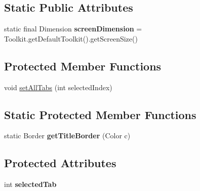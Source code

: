 \subsection*{Static Public Attributes}
\begin{DoxyCompactItemize}
\item 
\hypertarget{classgov_1_1fnal_1_1ppd_1_1dd_1_1ChangeChannelOnFrame_a305a0d34f0d58de670e2e105bd05635f}{static final Dimension {\bfseries screen\-Dimension} = Toolkit.\-get\-Default\-Toolkit().get\-Screen\-Size()}\label{classgov_1_1fnal_1_1ppd_1_1dd_1_1ChangeChannelOnFrame_a305a0d34f0d58de670e2e105bd05635f}

\end{DoxyCompactItemize}
\subsection*{Protected Member Functions}
\begin{DoxyCompactItemize}
\item 
void \hyperlink{classgov_1_1fnal_1_1ppd_1_1dd_1_1ChangeChannelOnFrame_aab9e479cfeecc447c6a061d7fbe2e054}{set\-All\-Tabs} (int selected\-Index)
\end{DoxyCompactItemize}
\subsection*{Static Protected Member Functions}
\begin{DoxyCompactItemize}
\item 
\hypertarget{classgov_1_1fnal_1_1ppd_1_1dd_1_1ChangeChannelOnFrame_ad3ecdc557c04618b3aecc20940e3080e}{static Border {\bfseries get\-Title\-Border} (Color c)}\label{classgov_1_1fnal_1_1ppd_1_1dd_1_1ChangeChannelOnFrame_ad3ecdc557c04618b3aecc20940e3080e}

\end{DoxyCompactItemize}
\subsection*{Protected Attributes}
\begin{DoxyCompactItemize}
\item 
\hypertarget{classgov_1_1fnal_1_1ppd_1_1dd_1_1ChangeChannelOnFrame_af667d17f45ce6f2a610c10746cd6b304}{int {\bfseries selected\-Tab}}\label{classgov_1_1fnal_1_1ppd_1_1dd_1_1ChangeChannelOnFrame_af667d17f45ce6f2a610c10746cd6b304}

\end{DoxyCompactItemize}


